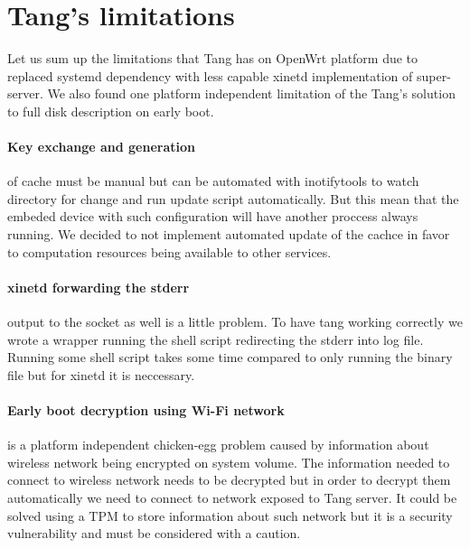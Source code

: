 \section{Tang's limitations}

Let us sum up the limitations that Tang has on OpenWrt platform due to replaced systemd dependency with less capable xinetd implementation of super-server.
We also found one platform independent limitation of the Tang's solution to full disk description on early boot.

\paragraph{Key exchange and generation} of cache must be manual but  can be automated with inotifytools to watch directory for change and run update script automatically.
But this mean that the embeded device with such configuration will have another proccess always running.
We decided to not implement automated update of the cachce in favor to computation resources being available to other services.

\paragraph{xinetd forwarding the stderr} output to the socket as well is a little problem.
To have tang working correctly we wrote a wrapper running the shell script redirecting the stderr into log file.
Running some shell script takes some time compared to only running the binary file but for xinetd it is neccessary.

\paragraph{Early boot decryption using Wi-Fi network} is a platform independent chicken-egg problem caused by information about wireless network being encrypted on system volume.
The information needed to connect to wireless network needs to be decrypted but in order to decrypt them automatically we need to connect to network exposed to Tang server.
It could be solved using a TPM to store information about such network but it is a security vulnerability and must be considered with a caution.

